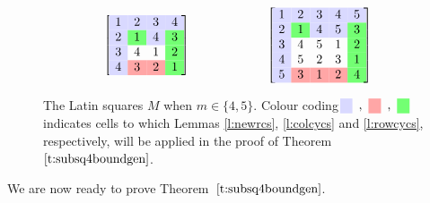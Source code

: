 \documentclass[12pt]{article}
\providecommand{\con}{\cellcolor{blue!15}}
\providecommand{\ctw}{\cellcolor{red!35}}
\providecommand{\cth}{\cellcolor{green!55}}
\theoremstyle{definition}
\numberwithin{equation}{section}
\def\tref#1{Theorem~$\ref{#1}$}
\begin{document}
	\begin{figure}
		\[
		\begin{minipage}{.4\textwidth}
			\begin{equation*}
				\left[\;
				\begin{matrix}
					\con1&\con2&\con3&\con4\\
					\con2&\cth1&\con4&\cth3\\
					\con3&4&1&\cth2\\
					\con4&\ctw3&\ctw2&\cth1
				\end{matrix}
				\;\right]
			\end{equation*}
		\end{minipage}
		\begin{minipage}{.4\textwidth}
			\begin{equation*}
				\left[\;
				\begin{matrix}
					\con1&\con2&\con3&\con4&\con5\\
					\con2&\cth1&\con4&\con5&\cth3\\
					\con3&4&5&1&\cth2\\
					\con4&5&2&3&\cth1\\
					\con5&\ctw3&\ctw1&\ctw2&\cth4
				\end{matrix}
				\;
				\right]
			\end{equation*}
		\end{minipage}
		\]
		\caption{\label{f:LS45}The Latin squares $M$ when
			$m\in\{4,5\}$. Colour coding
			$\;\begin{matrix}\con&,&\ctw&,&\cth\end{matrix}\;$ indicates cells
			to which Lemmas \ref{l:newrcs}, \ref{l:colcycs} and
			\ref{l:rowcycs}, respectively, will be applied in the proof of
			\tref{t:subsq4boundgen}.}
	\end{figure}
	
	We are now ready to prove \tref{t:subsq4boundgen}.
	
\end{document}

